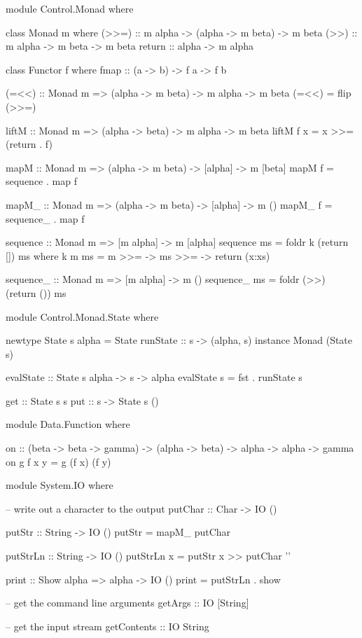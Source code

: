 \begin{code}
module Control.Monad where

class Monad m where
		(>>=) :: m alpha -> (alpha -> m beta) -> m beta
		(>>) :: m alpha -> m beta -> m beta
		return :: alpha -> m alpha

class Functor f where
	  fmap :: (a -> b) -> f a -> f b

(=<<) :: Monad m => (alpha -> m beta) -> m alpha -> m beta
(=<<) = flip (>>=)

liftM :: Monad m => (alpha -> beta) -> m alpha -> m beta
liftM f x = x >>= (return . f)

mapM :: Monad m => (alpha -> m beta) -> [alpha] -> m [beta]
mapM f = sequence . map f

mapM_ :: Monad m => (alpha -> m beta) -> [alpha] -> m ()
mapM_ f = sequence_ . map f

sequence :: Monad m => [m alpha] -> m [alpha] 
sequence ms = foldr k (return []) ms
	where k m ms = m >>= \x -> ms >>= \xs -> return (x:xs)

sequence_ :: Monad m => [m alpha] -> m () 
sequence_ ms = foldr (>>) (return ()) ms
\end{code}

\begin{code}
module Control.Monad.State where

newtype State s alpha = State {runState :: s -> (alpha, s)}
instance Monad (State s)

evalState :: State s alpha -> s -> alpha
evalState s = fst . runState s

get :: State s s
put :: s -> State s ()
\end{code}

\begin{code}
module Data.Function where

on :: (beta -> beta -> gamma) -> (alpha -> beta) -> alpha -> alpha -> gamma
on g f x y = g (f x) (f y)
\end{code}

\begin{code}
module System.IO where

-- write out a character to the output
putChar :: Char -> IO ()

putStr :: String -> IO ()
putStr = mapM_ putChar

putStrLn :: String -> IO ()
putStrLn x = putStr x >> putChar '\n'

print :: Show alpha => alpha -> IO ()
print = putStrLn . show

-- get the command line arguments
getArgs :: IO [String]

-- get the input stream
getContents :: IO String
\end{code}

